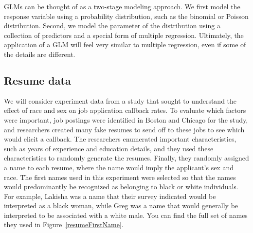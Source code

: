 GLMs can be thought of as a two-stage modeling approach.
We first model the response variable using a probability
distribution, such as the binomial or Poisson distribution.
Second, we model the parameter of the distribution using
a collection of predictors and a special form of multiple
regression.
Ultimately, the application of a GLM will feel very similar
to multiple regression, even if some of the details are
different.


\subsection{Resume data}


\newcommand{\resN}{4870}
\newcommand{\resCallbackProp}{0.0805}
\newcommand{\resCallbackPerc}{8.05\%}
\newcommand{\resNumPred}{8}
\newcommand{\resUniqueNames}{36}
\newcommand{\resHonorsInt}{-2.4998}
\newcommand{\resHonorsCoef}{0.8668}
\newcommand{\resHonorsIntPlusCoef}{-1.6330}
\newcommand{\resHonorsCoefSE}{0.1776}
\newcommand{\resHonorsCoefZ}{4.88}
\newcommand{\resHonorsProb}{0.163}
\newcommand{\resHonorsPerc}{16.3\%}
\newcommand{\resHonorsNotProb}{0.076}
\newcommand{\resHonorsNotPerc}{7.6\%}

We will consider experiment data from a study that sought
to understand the effect of race and sex on job application
callback rates.
To evaluate which factors were important,
job postings were identified in Boston and Chicago
for the study,
and researchers created many fake resumes to send off
to these jobs to see which would elicit a callback.
The researchers enumerated important characteristics,
such as years of
experience and education details, and they used these
characteristics to randomly generate the resumes.
Finally, they randomly assigned a name to each resume,
where the name would imply the applicant's sex and race.
The first names used in this experiment were selected so that
the names would predominantly be
recognized as belonging to black or white individuals.
For example, Lakisha was a name that their survey indicated
would be interpreted as a black woman, while Greg was a name
that would generally be interpreted to be associated with
a white male.
You can find the full set of names they used in
Figure~\ref{resumeFirstName}.

